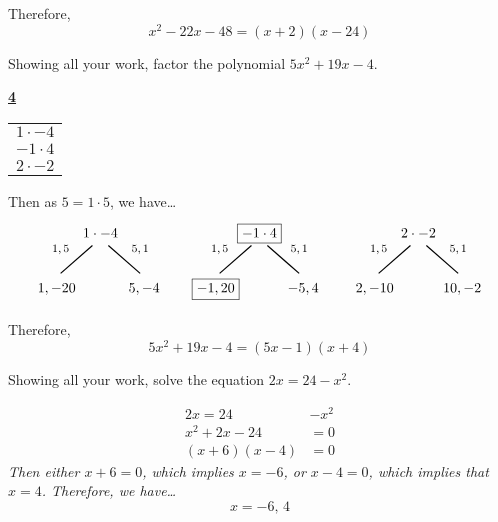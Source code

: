 \documentclass[12pt,letterpaper]{exam}
\begin{document}
\begin{questions}
{Therefore,
	\[
	x^2 - 22x - 48= (x + 2)(x - 24)
	\]
}



\newpage



\newpage
\question[6] Showing all your work, factor the polynomial $5x^2 + 19x - 4$. \pspace

	\begin{table}[!ht]
	\centering
	\underline{\bfseries 4} \pvspace{0.1cm}
	\begin{tabular}{c}
	$1 \cdot -4$ \\
	$-1 \cdot 4$ \\
	$2 \cdot -2$
	\end{tabular}
	\end{table} 

Then as $5= 1 \cdot 5$, we have\dots \pspace
	\[
	\begin{tikzpicture}
	\node at (0,0) {$1 \cdot -4$};
	\node at (-1.0,-0.4) {\footnotesize$1, 5$};
	\draw[line width=0.03cm,label={1}] (-0.2,-0.3) -- (-1,-1);
	\node at (-1.1,-1.4) {$1, -20$};
	\node at (1.0,-0.4) {\footnotesize$5, 1$};
	\draw[line width=0.03cm] (0.2,-0.3) -- (1,-1);
	\node at (1.1,-1.4) {$5, -4$};	
	
	\tikzset{shift={(4,0)}}

	\node at (0,0) {\framebox{$-1 \cdot 4$}};
	\node at (-1.0,-0.4) {\footnotesize$1, 5$};
	\draw[line width=0.03cm,label={1}] (-0.2,-0.3) -- (-1,-1);
	\node at (-1.1,-1.4) {\framebox{$-1, 20$}};
	\node at (1.0,-0.4) {\footnotesize$5, 1$};
	\draw[line width=0.03cm] (0.2,-0.3) -- (1,-1);
	\node at (1.1,-1.4) {$-5, 4$};

	\tikzset{shift={(4,0)}}

	\node at (0,0) {$2 \cdot -2$};
	\node at (-1.0,-0.4) {\footnotesize$1, 5$};
	\draw[line width=0.03cm,label={1}] (-0.2,-0.3) -- (-1,-1);
	\node at (-1.1,-1.4) {$2, -10$};
	\node at (1.0,-0.4) {\footnotesize$5, 1$};
	\draw[line width=0.03cm] (0.2,-0.3) -- (1,-1);
	\node at (1.1,-1.4) {$10, -2$};
	\end{tikzpicture}
	\] \pspace

Therefore, 
	\[
	5x^2 + 19x - 4= (5x - 1)(x + 4)
	\]



\newpage



\newpage
\question[6] Showing all your work, solve the equation $2x= 24 - x^2$. \pspace

{\itshape
	\[
	\begin{aligned}
	2x= 24 &- x^2 \\[0.3cm]
	x^2 + 2x - 24&= 0 \\[0.3cm]
	(x + 6)(x - 4)&= 0
	\end{aligned}
	\] \pspace
Then either $x + 6= 0$, which implies $x= -6$, or $x - 4= 0$, which implies that $x= 4$. Therefore, we have\dots \pvspace{0.1cm}
	\[
	x= -6,\, 4
	\]
}




\end{questions}
\end{document}
